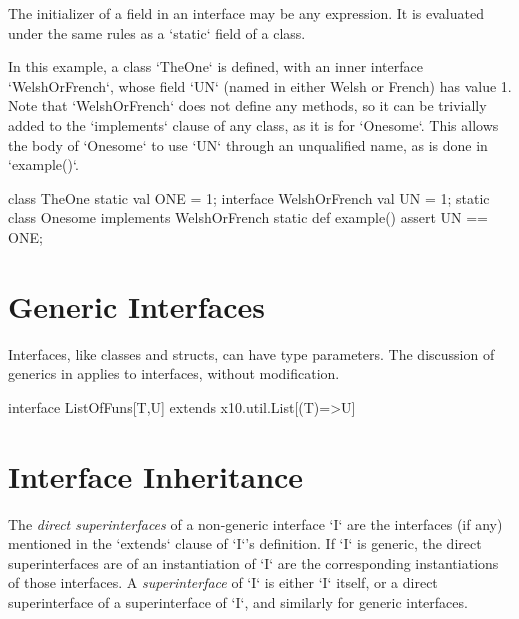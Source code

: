 The initializer of a field in an interface may be any expression.  It is
evaluated under the same rules as a \xcd`static` field of a class. 

\begin{ex}
In this example, a class \xcd`TheOne` is defined,
with an inner interface \xcd`WelshOrFrench`, whose field \xcd`UN` (named in
either Welsh or French) has value 1.  Note that \xcd`WelshOrFrench` does not
define any methods, so it can be trivially added to the \xcd`implements`
clause of any class, as it is for \xcd`Onesome`. 
This allows the body of \xcd`Onesome` to use \xcd`UN` through an unqualified
name, as is done in \xcd`example()`.

\begin{xten}
class TheOne {
  static val ONE = 1;
  interface WelshOrFrench {
    val UN = 1;
  }
  static class Onesome implements WelshOrFrench {
    static def example() {
      assert UN == ONE;
    }
  }
}
\end{xten}
\end{ex}

\section{Generic Interfaces}

Interfaces, like classes and structs, can have type parameters.  
The discussion of generics in  applies to interfaces,
without modification.

\begin{ex}
\begin{xten}
interface ListOfFuns[T,U] extends x10.util.List[(T)=>U] {}
\end{xten}
%

\end{ex}

\section{Interface Inheritance}

The {\em direct superinterfaces} of a non-generic interface \xcd`I` are the interfaces
(if any) mentioned in the \xcd`extends` clause of \xcd`I`'s definition.
If \xcd`I`  is generic, the direct superinterfaces are of an instantiation of
\xcd`I` are the corresponding instantiations of those interfaces.
A {\em superinterface} of \xcd`I` is either \xcd`I` itself, or a direct
superinterface of a superinterface of \xcd`I`, and similarly for generic
interfaces.    

